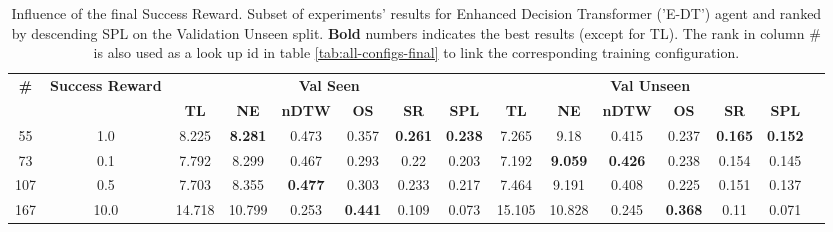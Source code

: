 \begin{table}
\centering
\caption{\label{tab:e_dt_reward_scale}Influence of the final Success Reward. Subset of experiments' results for Enhanced Decision Transformer ('E-DT') agent and ranked by descending SPL on the Validation Unseen split. \textbf{Bold} numbers indicates the best results (except for TL). The rank in column \# is also used as a look up id in table \ref{tab:all-configs-final} to link the corresponding training configuration.}
\begin{tabular}{@{\hskip3pt}c@{\hskip3pt}c@{\hskip3pt}c@{\hskip3pt}c@{\hskip3pt}c@{\hskip3pt}c@{\hskip3pt}c@{\hskip3pt}c@{\hskip3pt}c@{\hskip3pt}c@{\hskip3pt}c@{\hskip3pt}c@{\hskip3pt}c@{\hskip3pt}c@{\hskip3pt}c}
\toprule
                                  \textbf{\#} & \textbf{Success Reward } & \multicolumn{6}{c}{\textbf{Val Seen}} & \multicolumn{6}{c}{\textbf{Val Unseen}} \\
\cmidrule(l){3-8}\cmidrule(l){9-14}\textbf{~} &               \textbf{~} &       \textbf{TL} &     \textbf{NE} &   \textbf{nDTW} &     \textbf{OS} &     \textbf{SR} &    \textbf{SPL} &         \textbf{TL} &     \textbf{NE} &   \textbf{nDTW} &     \textbf{OS} &     \textbf{SR} &    \textbf{SPL} \\
\midrule
                                           55 &                      1.0 &             8.225 &  \textbf{8.281} &           0.473 &           0.357 &  \textbf{0.261} &  \textbf{0.238} &               7.265 &            9.18 &           0.415 &           0.237 &  \textbf{0.165} &  \textbf{0.152} \\
                                           73 &                      0.1 &             7.792 &           8.299 &           0.467 &           0.293 &            0.22 &           0.203 &               7.192 &  \textbf{9.059} &  \textbf{0.426} &           0.238 &           0.154 &           0.145 \\
                                          107 &                      0.5 &             7.703 &           8.355 &  \textbf{0.477} &           0.303 &           0.233 &           0.217 &               7.464 &           9.191 &           0.408 &           0.225 &           0.151 &           0.137 \\
                                          167 &                     10.0 &            14.718 &          10.799 &           0.253 &  \textbf{0.441} &           0.109 &           0.073 &              15.105 &          10.828 &           0.245 &  \textbf{0.368} &            0.11 &           0.071 \\
\bottomrule
\end{tabular}
\end{table}
